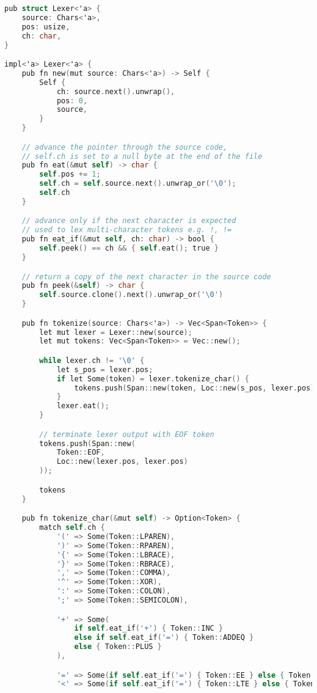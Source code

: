 \begin{lstlisting}[language=C]
pub struct Lexer<'a> {
    source: Chars<'a>,
    pos: usize,
    ch: char,
}

impl<'a> Lexer<'a> {
    pub fn new(mut source: Chars<'a>) -> Self {
        Self {
            ch: source.next().unwrap(),
            pos: 0,
            source,
        }
    }

    // advance the pointer through the source code, 
    // self.ch is set to a null byte at the end of the file
    pub fn eat(&mut self) -> char {
        self.pos += 1;
        self.ch = self.source.next().unwrap_or('\0');
        self.ch
    }

    // advance only if the next character is expected
    // used to lex multi-character tokens e.g. !, !=
    pub fn eat_if(&mut self, ch: char) -> bool {
        self.peek() == ch && { self.eat(); true }
    }

    // return a copy of the next character in the source code
    pub fn peek(&self) -> char {
        self.source.clone().next().unwrap_or('\0')
    }

    pub fn tokenize(source: Chars<'a>) -> Vec<Span<Token>> {
        let mut lexer = Lexer::new(source);
        let mut tokens: Vec<Span<Token>> = Vec::new();

        while lexer.ch != '\0' {
            let s_pos = lexer.pos;
            if let Some(token) = lexer.tokenize_char() {
                tokens.push(Span::new(token, Loc::new(s_pos, lexer.pos)));
            }
            lexer.eat();
        }

        // terminate lexer output with EOF token
        tokens.push(Span::new(
            Token::EOF,
            Loc::new(lexer.pos, lexer.pos)
        ));

        tokens
    }

    pub fn tokenize_char(&mut self) -> Option<Token> {
        match self.ch {
            '(' => Some(Token::LPAREN),
            ')' => Some(Token::RPAREN),
            '{' => Some(Token::LBRACE),
            '}' => Some(Token::RBRACE),
            ',' => Some(Token::COMMA),
            '^' => Some(Token::XOR),
            ':' => Some(Token::COLON),
            ';' => Some(Token::SEMICOLON),

            '+' => Some(
                if self.eat_if('+') { Token::INC } 
                else if self.eat_if('=') { Token::ADDEQ } 
                else { Token::PLUS }
            ),

            '=' => Some(if self.eat_if('=') { Token::EE } else { Token::EQ }),
            '<' => Some(if self.eat_if('=') { Token::LTE } else { Token::LT }),


\end{lstlisting}
